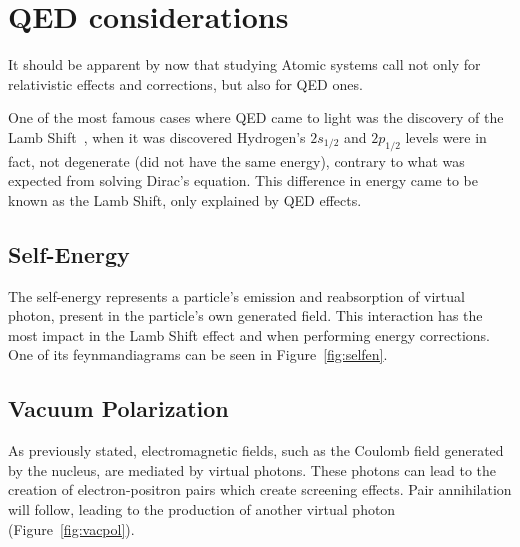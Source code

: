 
%

\chapter{QED considerations}\label{ap:QED}

It should be apparent by now that studying Atomic systems call not only for relativistic effects and corrections, but also for QED ones.

One of the most famous cases where QED came to light was the discovery of the Lamb Shift~\cite{Lamb1947}, when it was discovered Hydrogen's $2s_{1/2}$ and $2p_{1/2}$ levels were in fact, not degenerate (did not have the same energy), contrary to what was expected from solving Dirac's equation. This difference in energy came to be known as the Lamb Shift, only explained by QED effects.


\section{Self-Energy}

The self-energy represents a particle's  emission and reabsorption of virtual photon, present in the particle's own generated field. This interaction has the most impact in the Lamb Shift effect and when performing energy corrections. One of its \glspl{feynmandiagram} can be seen in Figure~\ref{fig:selfen}.


\section{Vacuum Polarization}

As previously stated, electromagnetic fields, such as the Coulomb field generated by the nucleus, are mediated by virtual photons. These photons can lead to the creation of electron-positron pairs which create screening effects. Pair annihilation will follow, leading to the production of another virtual photon (Figure~\ref{fig:vacpol}).

